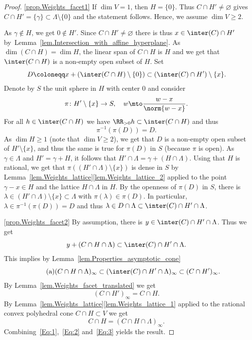 \skpt
\begin{proof}
\eqref{prop.Weights_facet1}
If $\dim V = 1$, then $H = \{0\}$. Thus
$C \cap H' \neq \varnothing$ gives $C \cap H' = \{\gamma\} \subset \Lambda \setminus \{0\}$ and
the statement follows. Hence, we assume $\dim V \geq 2$.

As $\gamma \not\in H$, we get $0 \not\in H'$.
Since $C \cap H' \neq \varnothing$ there is thus $x \in \inter(C) \cap H'$
by~Lemma~\ref{lem.Intersection_with_affine_hyperplane}.
As $\dim(C \cap H) = \dim H$, the linear
span of $C \cap H$ is $H$ and we get that
$\inter(C \cap H)$ is a non-empty open subset of $H$. Set
\[
D \coloneqq x + (\inter(C\cap H) \setminus \{0\}) \subset (\inter(C) \cap H') \setminus \{x\}.
\]
Denote by $S$ the unit sphere in $H$ with center $0$ and consider
\[
\pi \colon H' \setminus \{x\} \to S, \quad w \mto \frac{w-x}{\norm{w-x}}.
\]
For all $h \in \inter(C \cap H)$ we have $\RR_{> 0}h \subset \inter(C \cap H)$ and thus
\[
\pi^{-1}(\pi(D)) = D.
\]
As $\dim H \geq 1$ (note that $\dim V \geq 2$), we get that $D$ is a non-empty open subset of $H' \setminus \{x\}$, and thus
the same is true
for $\pi(D)$ in $S$ (because $\pi$ is open). As
$\gamma \in \Lambda$ and $H' = \gamma + H$, it follows that
$H' \cap \Lambda = \gamma + (H \cap \Lambda)$. Using that $H$ is rational,
we get that
$\pi((H' \cap \Lambda) \setminus \{x\})$ is dense in $S$ by Lemma~\ref{lem.Weights_lattice}\eqref{lem.Weights_lattice_2} applied to the point $\gamma - x \in H$
and the lattice $H \cap \Lambda$ in $H$.
By the openness of $\pi(D)$ in $S$,
there is $\lambda \in (H' \cap \Lambda) \setminus \{x\} \subset \Lambda$
with $\pi(\lambda) \in \pi(D)$.
In particular, $\lambda \in \pi^{-1}(\pi(D)) = D$ and thus
$\lambda \in D \cap \Lambda \subset \inter(C) \cap H' \cap \Lambda$.

\eqref{prop.Weights_facet2} By assumption, there is $y \in \inter(C) \cap H' \cap \Lambda$. Thus
we get
\[
y + (C \cap H \cap \Lambda) \subset \inter(C) \cap H' \cap \Lambda.
\]
This implies by Lemma~\ref{lem.Properties_asymptotic_cone}
\[
\label{Eq:1}
\tag{a}
(C \cap H \cap \Lambda)_{\infty} \subset (\inter(C) \cap H' \cap \Lambda)_{\infty}
\subset (C \cap H')_{\infty}.
\]
By Lemma~\ref{lem.Weights_facet_translated} we get
\[
\label{Eq:2}
\tag{b}
(C \cap H')_{\infty} = C \cap H.
\]
By Lemma~\ref{lem.Weights_lattice}\eqref{lem.Weights_lattice_1}
applied to the rational convex polyhedral cone
$C \cap H \subset V$ we get
\[
\label{Eq:3}
\tag{c}
C \cap H = (C \cap H \cap \Lambda)_{\infty}.
\]
Combining~\eqref{Eq:1},~\eqref{Eq:2} and~\eqref{Eq:3} yields the result.
\end{proof}

